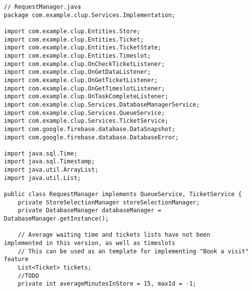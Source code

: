 \begin{lstlisting}
// RequestManager.java
package com.example.clup.Services.Implementation;

import com.example.clup.Entities.Store;
import com.example.clup.Entities.Ticket;
import com.example.clup.Entities.TicketState;
import com.example.clup.Entities.Timeslot;
import com.example.clup.OnCheckTicketListener;
import com.example.clup.OnGetDataListener;
import com.example.clup.OnGetTicketListener;
import com.example.clup.OnGetTimeslotListener;
import com.example.clup.OnTaskCompleteListener;
import com.example.clup.Services.DatabaseManagerService;
import com.example.clup.Services.QueueService;
import com.example.clup.Services.TicketService;
import com.google.firebase.database.DataSnapshot;
import com.google.firebase.database.DatabaseError;

import java.sql.Time;
import java.sql.Timestamp;
import java.util.ArrayList;
import java.util.List;

public class RequestManager implements QueueService, TicketService {
    private StoreSelectionManager storeSelectionManager;
    private DatabaseManager databaseManager = DatabaseManager.getInstance();

    // Average waiting time and tickets lists have not been implemented in this version, as well as timeslots
    // This can be used as an template for implementing "Book a visit" feature
    List<Ticket> tickets;
    //TODO
    private int averageMinutesInStore = 15, maxId = -1;


\end{lstlisting}
